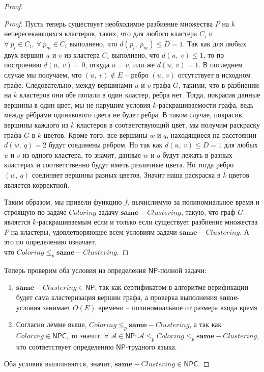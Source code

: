 \documentclass[a4paper,12pt]{article}
\newcommand{\NPclass}{\mathsf{NP}}
\newcommand{\NPCclass}{\mathsf{NPC}}
\begin{document}
\begin{proof}
\begin{proof}
        Пусть теперь существует необходимое разбиение множества $P$ на $k$ непересекающихся кластеров, таких, что для любого кластера $C_i$ и $\forall\ p_l \in C_i,\ \forall\ p_m \in C_i$ выполнено, что $d(p_l,\ p_m) \leqslant D = 1$. Так как для любых двух вершин $u$ и $v$ из кластера $C_i$ выполнено, что $d(u,\ v) \leqslant 1$, то по построению $d(u,\ v) = 0$, откуда $u = v$, или же $d(u,\ v) = 1$. В последнем случае мы получаем, что $(u,\ v) \notin E$ -- ребро $(u,\ v)$ отсутствует в исходном графе. Следовательно, между вершинами $u$ и $v$ графа $G$, такими, что в разбиении на $k$ кластеров они обе попали в один кластер, ребра нет. Тогда, покрасив данные вершины в один цвет, мы не нарушим условия $k$-раскрашиваемости графа, ведь между рёбрами одинакового цвета не будет ребра. В таком случае, покрасив вершины каждого из $k$ кластеров в соответствующий цвет, мы получим раскраску графа $G$ в $k$ цветов. Кроме того, все вершины $w$ и $q$, находящиеся на расстоянии $d(w,\ q) = 2$ будут соединены ребром. Но так как $d(u,\ v) \leqslant D = 1$ для любых $u$ и $v$ из одного кластера, то значит, данные $w$ и $q$ будут лежать в разных кластерах и соответственно будут иметь различные цвета. Но тогда ребро $(w,\ q)$ соединяет вершины разных цветов. Значит наша раскраска в $k$ цветов является корректной.
        
        Таким образом, мы привели функцию $f$, вычислимую за полиномиальное время и строящую по задаче $Coloring$ задачу $\textbf{same}-Clustering$, такую, что граф $G$ является $k$-раскрашиваемым если и только если существует разбиение множества $P$ на кластеры, удовлетворяющее всем условиям задачи $\textbf{same}-Clustering$. А это по определению означает,\\ что $Coloring \leqslant_p \textbf{same}-Clustering$.
    \end{proof}
    Теперь проверим оба условия из определения $\NPclass$-полной задачи:
    \begin{enumerate}
        \item $\textbf{same}-Clustering \in \NPclass$, так как сертификатом в алгоритме верификации будет сама кластеризация вершин графа, а проверка выполнения \textbf{same}-условия занимает $O(E)$ времени -- полиномиальное от размера входа время.
        \item Согласно лемме выше, $Coloring \leqslant_p \textbf{same}-Clustering$, а так как $Coloring \in \NPCclass$, то значит, $\forall\ \mathscr{A} \in \NPclass: \mathscr{A} \leqslant_p Coloring \leqslant_p \textbf{same}-Clustering$, что соответствует определению $\NPclass$-трудного языка.
    \end{enumerate}
    Оба условия выполняются, значит, $\textbf{same}-Clustering \in \NPCclass$.
\end{proof}
\end{document}
